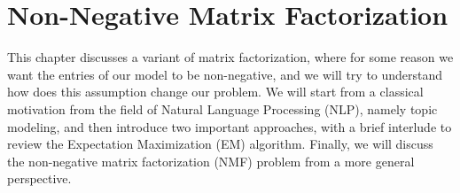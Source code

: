 \documentclass[../main.tex]{subfiles}
\begin{document}

\chapter{Non-Negative Matrix Factorization}
This chapter discusses a variant of matrix factorization, where for some reason we want the entries of our model to be non-negative, and we will try to understand how does this assumption change our problem. We will start from a classical motivation from the field of Natural Language Processing (NLP), namely topic modeling, and then introduce two important approaches, with a brief interlude to review the Expectation Maximization (EM) algorithm. Finally, we will discuss the non-negative matrix factorization (NMF) problem from a more general perspective.
\end{document}
